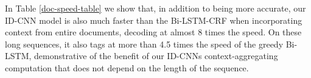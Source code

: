 \begin{table}
\begin{center}
\end{center}
  \caption{Comparing ID-CNNs with 1) back-propagating loss only from the final layer ({\bf 1-loss}) and 2) untied parameters across blocks ({\bf noshare})}
  \label{doc-loss-table}
\end{table}

In Table \ref{doc-speed-table} we show that, in addition to being more accurate, our ID-CNN model is also much faster than the Bi-LSTM-CRF when incorporating context from entire documents, decoding at almost 8 times the speed. On these long sequences, it also tags at more than 4.5 times the speed of the greedy Bi-LSTM, demonstrative of the benefit of our ID-CNNs context-aggregating computation that does not depend on the length of the sequence.


\begin{table}
\begin{center}
    \end{center}
  \caption{Relative test-time speed of document models (fastest batch size for each model).}
  \label{doc-speed-table}
\end{table}

